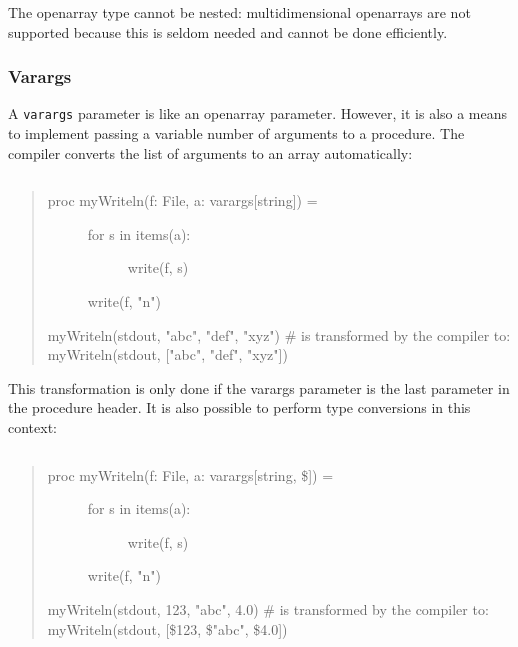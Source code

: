 The openarray type cannot be nested: multidimensional openarrays are not
supported because this is seldom needed and cannot be done efficiently.

\hypertarget{varargs}{%
\subsubsection{Varargs}\label{varargs}}

A \texttt{varargs} parameter is like an openarray parameter. However, it
is also a means to implement passing a variable number of arguments to a
procedure. The compiler converts the list of arguments to an array
automatically:

\begin{verbatim}
\end{verbatim}

\begin{quote}
\begin{description}
\item[proc myWriteln(f: File, a: varargs{[}string{]}) =]
\begin{description}
\item[for s in items(a):]
write(f, s)
\end{description}

write(f, "n")
\end{description}

myWriteln(stdout, "abc", "def", "xyz") \# is transformed by the compiler
to: myWriteln(stdout, {[}"abc", "def", "xyz"{]})
\end{quote}

This transformation is only done if the varargs parameter is the last
parameter in the procedure header. It is also possible to perform type
conversions in this context:

\begin{verbatim}
\end{verbatim}

\begin{quote}
\begin{description}
\item[proc myWriteln(f: File, a: varargs{[}string, {\$}{]}) =]
\begin{description}
\item[for s in items(a):]
write(f, s)
\end{description}

write(f, "n")
\end{description}

myWriteln(stdout, 123, "abc", 4.0) \# is transformed by the compiler to:
myWriteln(stdout, {[}\$123, \$"abc", \$4.0{]})
\end{quote}

